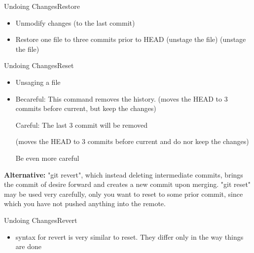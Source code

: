 \begin{frame}{Undoing Changes}{Restore}
\begin{itemize}
  \item Unmodify changes (to the last commit)
  \item Restore one file to three commits prior to HEAD
     (unstage the file)
     (unstage the file)
\end{itemize}
\end{frame}

\begin{frame}{Undoing Changes}{Reset}
\begin{itemize}
  \item Unsaging a file
  \item Becareful: This command removes the history.
     (moves the HEAD to 3 commits before current, but keep the changes)
    \begin{center}
    {\color{red} Careful: The last 3 commit will be removed}
  \end{center}
     (moves the HEAD to 3 commits before current and do nor keep the changes)
    \begin{center}
      {\color{red} Be even more careful}
  \end{center}
\end{itemize}
{\textbf{ \color{green} Alternative:}} {\footnotesize "git revert", which instead deleting intermediate 
commits, brings the commit of desire forward and creates a new commit upon merging.
"git reset" may be used very carefully, only you want to reset to some prior commit, 
since which you have not pushed anything into the remote.}
\end{frame}

\begin{frame}{Undoing Changes}{Revert}
\begin{itemize}
  \item syntax for revert is very similar to reset. They differ only in the way things are done
\end{itemize}
\end{frame}
